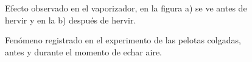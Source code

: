 \documentclass[10pt,a4paper]{article}
\begin{document}
\begin{figure}[H]
    \centering
    \qquad
    \caption{Efecto observado en el vaporizador, en la figura a) se ve antes de hervir y en la b) después de hervir.}%
    \label{fig:example}%
\end{figure}

\begin{figure}[H]
    \centering
    \qquad
    \caption{Fenómeno registrado en el experimento de las pelotas colgadas, antes y durante el momento de echar aire.}%
    \label{fig:example}%
\end{figure}
\end{document}
